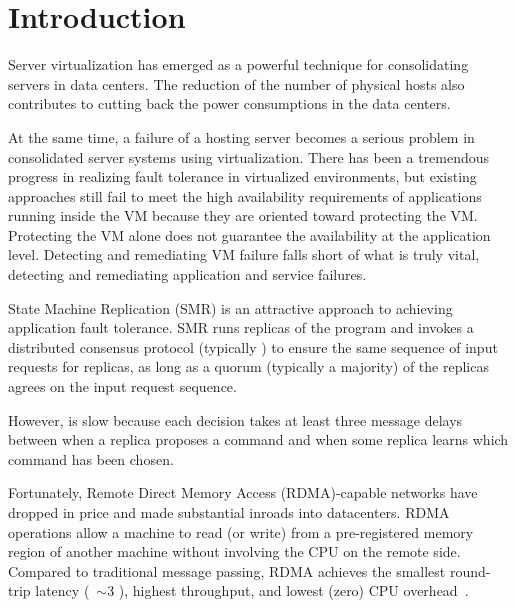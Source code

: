 \section{Introduction} \label{sec:intro}


Server virtualization has emerged as a powerful technique for consolidating servers in 
data centers. The reduction of the number of physical hosts also contributes to cutting 
back the power consumptions in the data centers.


At the same time, a failure of a hosting server becomes a serious problem in consolidated 
server systems using virtualization. There has been a tremendous progress in realizing fault 
tolerance in virtualized environments, but existing approaches still fail to meet the high 
availability requirements of applications running inside the VM because they are oriented 
toward protecting the VM. Protecting the VM alone does not guarantee the availability at the 
application level. Detecting and remediating VM failure falls short of what is truly vital, 
detecting and remediating application and service failures.

State Machine Replication (SMR) is an attractive approach to achieving application fault tolerance. 
SMR runs replicas of the program and invokes a distributed consensus protocol 
(typically \paxos) to ensure the same sequence of input requests for replicas, as long as a 
quorum (typically a majority) of the replicas agrees on the input request sequence.

However, \paxos is slow because each decision takes at least three message delays between when 
a replica proposes a command and when some replica learns which command has been chosen.

Fortunately, Remote Direct Memory Access (RDMA)-capable networks have dropped in price and made 
substantial inroads into datacenters. RDMA operations allow a machine to read (or write) from a 
pre-registered memory region of another machine without involving the CPU on the remote side. 
Compared to traditional message passing, RDMA achieves the smallest round-trip latency 
(~$\sim$3 \us), highest throughput, and lowest (zero) CPU overhead~\cite{pilaf:usenix14}.

